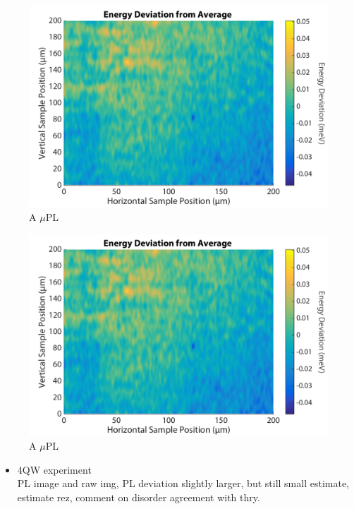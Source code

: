 \begin{figure}[h!]
\centering
\includegraphics[width = .8\textwidth]{10QW_devplot.png}
\caption{ \doublespacing A $\mu$PL }
\label{4qwimg}
\end{figure}
\begin{figure}[h!]
\centering
\includegraphics[width = .8\textwidth]{10QW_devplot.png}
\caption{ \doublespacing A $\mu$PL }
\label{4qwdev}
\end{figure}
\begin{itemize}
\item 4QW experiment\\
\* PL image and raw img, PL deviation slightly larger, but still small estimate, estimate rez, comment on disorder agreement with thry.
\end{itemize}


